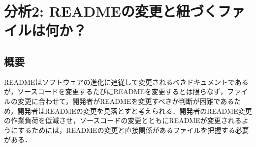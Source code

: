 \documentclass[submit]{ipsj}
\begin{document}
\section{分析2: READMEの変更と紐づくファイルは何か？}


\subsection{概要}








READMEはソフトウェアの進化に追従して変更されるべきドキュメントであるが，ソースコードを変更するたびにREADMEを変更するとは限らなず，ファイルの変更に合わせて，開発者がREADMEを変更すべきか判断が困難であるため，開発者はREADMEの変更を見落とすと考えられる．開発者のREADME変更の作業負荷を低減させ，ソースコードの変更とともにREADMEが変更されるようにするためには，READMEの変更と直接関係があるファイルを把握する必要がある．
\end{document}
